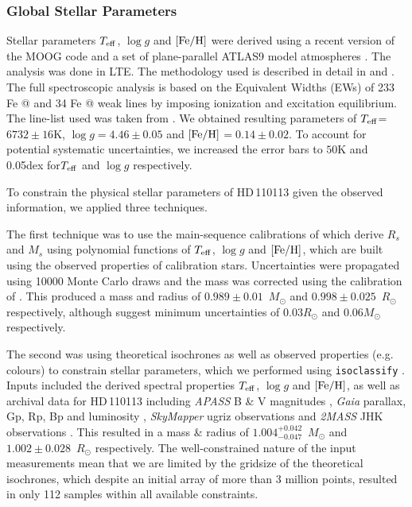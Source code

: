 \documentclass[fleqn,usenatbib]{mnras}
\makeatletter
\newcommand*{\rom}[1]{\expandafter\@slowromancap\romannumeral #1@}
\newcommand{\msun}{\mbox{$M_{\odot}$}}
\newcommand{\rsun}{\mbox{$R_{\odot}$}}
\newcommand{\teff}{$T_{\rm eff}$}
\newcommand{\feh}{\mbox{$\rm [Fe/H]$}}
\newcommand{\logg}{$\log g$}
\newcommand{\Tmstartorres}{ $ 0.989 \pm 0.01 $ }
\newcommand{\Trstartorres}{ $ 0.998 \pm 0.025 $ }
\newcommand{\Tradiso}{ $ 1.002 \pm 0.028 $ }
\newcommand{\Tmassiso}{ $ 1.004^{+0.042}_{-0.047} $ }
\newcommand{\Tstar}{HD\,110113}
\makeatother
\begin{document}
\subsubsection{Global Stellar Parameters}\label{sect:starpars}
Stellar parameters \teff{}, \logg{} and \feh{} were derived using a recent version of the MOOG code \citep{1973ApJ...184..839S} and a set of plane-parallel ATLAS9 model atmospheres  \citep{Kurucz-93}. The analysis was done in LTE. 
The methodology used is described in detail in \citet{2011A&A...533A.141S} and \citet{2013A&A...556A.150S}. 
The full spectroscopic analysis is based on the Equivalent Widths (EWs) of 233 Fe \rom{1} and 34 Fe \rom{2} weak lines by imposing ionization and excitation equilibrium. 
The line-list used was taken from \citet{2008A&A...487..373S}.
We obtained resulting parameters of \teff{}=$6732\pm16$K, \logg{}$=4.46\pm0.05$ and \feh{}$=0.14\pm0.02$.
To account for potential systematic uncertainties, we increased the error bars to $50$K and 0.05dex for\teff{} and \logg{} respectively.

To constrain the physical stellar parameters of \Tstar{} given the observed information, we applied three techniques.

The first technique was to use the main-sequence calibrations of \citet{2010A&ARv..18...67T} which derive $R_s$ and $M_s$ using polynomial functions of \teff{}, \logg{} and \feh{}, which are built using the observed properties of calibration stars. 
Uncertainties were propagated using 10000 Monte Carlo draws and the mass was corrected using the calibration of \citet{Santos-13}. 
This produced a mass and radius of \Tmstartorres{}\,\msun{} and \Trstartorres{}\,\rsun{} respectively, although \citet{2010A&ARv..18...67T} suggest minimum uncertainties of 0.03\rsun{} and 0.06\msun{} respectively.

The second was using theoretical isochrones \citep[MIST,][]{2016ApJ...823..102C} as well as observed properties (e.g. colours) to constrain stellar parameters, which we performed using \texttt{isoclassify} \citep{2017zndo....573372H,2020AJ....159..280B}.
Inputs included the derived spectral properties \teff{}, \logg{} and \feh{}, as well as archival data for \Tstar{} including {\it APASS} B \& V magnitudes \citep{apass}, {\it Gaia} parallax, Gp, Rp, Bp and luminosity \citep{brown2018gaia}, \textit{SkyMapper} ugriz observations \citep{2020arXiv200810359O} and {\it 2MASS} JHK observations \citep{skrutskie2006two}.
This resulted in a mass \& radius of \Tmassiso{}\,\msun{} and \Tradiso{}\,\rsun{} respectively.
The well-constrained nature of the input measurements mean that we are limited by the gridsize of the theoretical isochrones, which despite an initial array of more than 3 million points, resulted in only 112 samples within all available constraints.
\end{document}
